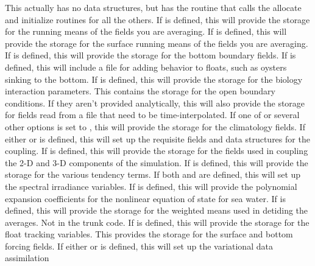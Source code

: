 \begin{klist}
   This actually has no data structures, but has the
    routine that calls the allocate and initialize routines for all the
    others.
   If  is defined, this will
    provide the storage for the running means of the fields you are averaging.
   If  is defined, this will
    provide the storage for the surface running means of the fields you are
    averaging.
    If  is defined, this will
    provide the storage for the bottom boundary fields.
    If  is defined, this will
    include a file for adding behavior to floats, such as oysters
    sinking to the bottom.
    If  is defined, this will
    provide the storage for the biology interaction parameters.
   This contains the storage for the open boundary
    conditions. If they aren't provided analytically, this will also provide
    the storage for fields read from a file that need to be time-interpolated.
    If one of 
    or several other options is set to , this will
    provide the storage for the climatology fields.
    If either   or
     is defined, this will set up the requisite fields and
    data structures for the coupling.
    If  is defined, this will
    provide the storage for the fields used in coupling the 2-D
    and 3-D components of the simulation.
    If  is defined, this will
    provide the storage for the various tendency terms.
    If both  and 
    are defined, this will set up the spectral irradiance
    variables.
    If  is defined, this will
    provide the polynomial expansion coefficients for the nonlinear equation
    of state for sea water.
   If  is defined, this will provide
    the storage for the weighted means used in detiding the averages.
    Not in the trunk code.
   If  is defined, this will
    provide the storage for the float tracking variables.
   This
    provides the storage for the surface and bottom forcing fields.
   If either  or 
    is defined, this will set up the variational data assimilation

\end{klist}
